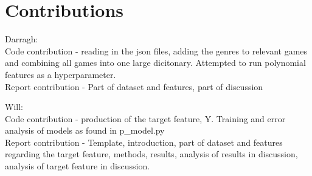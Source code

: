 \section{Contributions}

Darragh: \\Code contribution - reading in the json files, adding the genres to relevant games and combining all games into one large dicitonary. Attempted to run polynomial features as a hyperparameter.\\ Report contribution - Part of dataset and features, part of discussion

Will:
\\Code contribution - production of the target feature, Y. Training and error analysis of models as found in p\_model.py\\ Report contribution - Template, introduction, part of dataset and features regarding the target feature, methods, results, analysis of results in discussion, analysis of target feature in discussion.